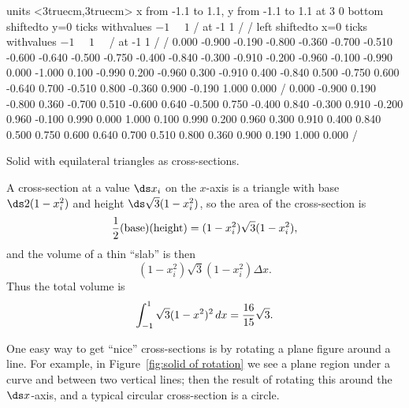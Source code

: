 \figure[H]
\centerline{\vbox{\beginpicture
\normalgraphs
\setcoordinatesystem units <3truecm,3truecm>
\setplotarea x from -1.1 to 1.1, y from -1.1 to 1.1
 at 3 0
\axis bottom shiftedto y=0 ticks withvalues {$-1\quad$} {$1$} / at -1 1 / /
\axis left shiftedto x=0 ticks withvalues {$-1\quad$} {$1\quad$} / at -1 1 / /
 0.000 -0.900 -0.190 -0.800 -0.360 -0.700 -0.510 -0.600 -0.640 
-0.500 -0.750 -0.400 -0.840 -0.300 -0.910 -0.200 -0.960 -0.100 -0.990 
0.000 -1.000 0.100 -0.990 0.200 -0.960 0.300 -0.910 0.400 -0.840 
0.500 -0.750 0.600 -0.640 0.700 -0.510 0.800 -0.360 0.900 -0.190 
1.000 0.000 /
 0.000 -0.900 0.190 -0.800 0.360 -0.700 0.510 -0.600 0.640 
-0.500 0.750 -0.400 0.840 -0.300 0.910 -0.200 0.960 -0.100 0.990 
0.000 1.000 0.100 0.990 0.200 0.960 0.300 0.910 0.400 0.840 
0.500 0.750 0.600 0.640 0.700 0.510 0.800 0.360 0.900 0.190 
1.000 0.000 /
\endpicture}}
\caption
{Solid with equilateral triangles as cross-sections.\label{fig:triangular cross-sections}}
\endfigure

\begin{solution}
A cross-section at a value $\ds x_i$ on the $x$-axis is a triangle with
base $\ds 2(1-x_i^2)$ and height $\ds \sqrt3(1-x_i^2)$, so the area of the
cross-section is 
$$
  {1\over2}(\hbox{base})(\hbox{height})=
  (1-x_i^2)\sqrt3(1-x_i^2),
$$
and the volume of a thin ``slab'' is then
$$(1-x_i^2)\sqrt3(1-x_i^2)\Delta x.$$
Thus the total volume is 
$$\int_{-1}^1 \sqrt3(1-x^2)^2\,dx={16\over15}\sqrt3.$$
\vskip-10pt
\end{solution}

One easy way to get ``nice'' cross-sections is by rotating a plane
figure around a line. For example, in Figure~\ref{fig:solid of rotation} 
we see a plane region under a curve and between two
vertical lines; then the result of rotating this around the $\ds x$-axis, and
a typical circular cross-section is a circle.
 

